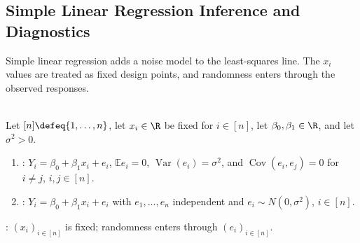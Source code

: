 \subsection{Simple Linear Regression Inference and Diagnostics}

Simple linear regression adds a noise model to the least-squares line.  The $x_i$ values are treated as fixed design points, and randomness enters through the observed responses.

\begin{definition} \label{def:simple-linear-regression-standard-model} \\
Let $[n]\defeq\{1,\ldots,n\}$, let $x_i\in\R$ be fixed for $i\in[n]$, let $\beta_0,\beta_1\in\R$, and let $\sigma^2>0$.
\begin{enumerate}[label=(\roman*)]
\setlength{\itemsep}{0pt}
\item {}: $Y_i=\beta_0+\beta_1x_i+e_i$, $\mathbb{E}e_i=0$, $\operatorname{Var}(e_i)=\sigma^2$, and $\operatorname{Cov}(e_i,e_j)=0$ for $i\neq j$, $i,j\in[n]$.
\item {}: $Y_i=\beta_0+\beta_1x_i+e_i$ with $e_1,\ldots,e_n$ independent and $e_i\sim N(0,\sigma^2)$, $i\in[n]$.
\end{enumerate}
: $(x_i)_{i\in[n]}$ is fixed; randomness enters through $(e_i)_{i\in[n]}$.
\end{definition}


